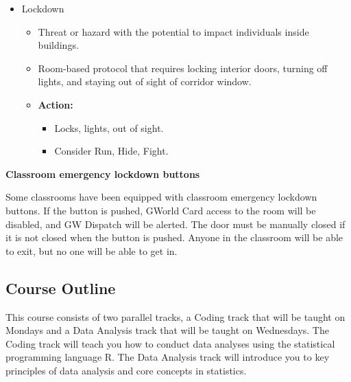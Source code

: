 \documentclass[12pt,letterpaper]{article}
\begin{document}
\begin{itemize}
\begin{itemize}
    \end{itemize}
    \item Lockdown
    \begin{itemize}
        \item Threat or hazard with the potential to impact individuals inside buildings.
        \item Room-based protocol that requires locking interior doors, turning off lights, and staying out of sight of corridor window.
        \item \textbf{Action:}
        \begin{itemize}
            \item Locks, lights, out of sight.
            \item Consider Run, Hide, Fight.
        \end{itemize}
    \end{itemize}
\end{itemize}

\textbf{Classroom emergency lockdown buttons}

Some classrooms have been equipped with classroom emergency lockdown buttons. If the button is pushed, GWorld Card access to the room will be disabled, and GW Dispatch will be alerted. The door must be manually closed if it is not closed when the button is pushed. Anyone in the classroom will be able to exit, but no one will be able to get in.

\subsection*{Course Outline}

This course consists of two parallel tracks, a Coding track that will be taught on Mondays and a Data Analysis track that will be taught on Wednesdays. The Coding track will teach you how to conduct data analyses using the statistical programming language R. The Data Analysis track will introduce you to key principles of data analysis and core concepts in statistics. 
\end{document}
